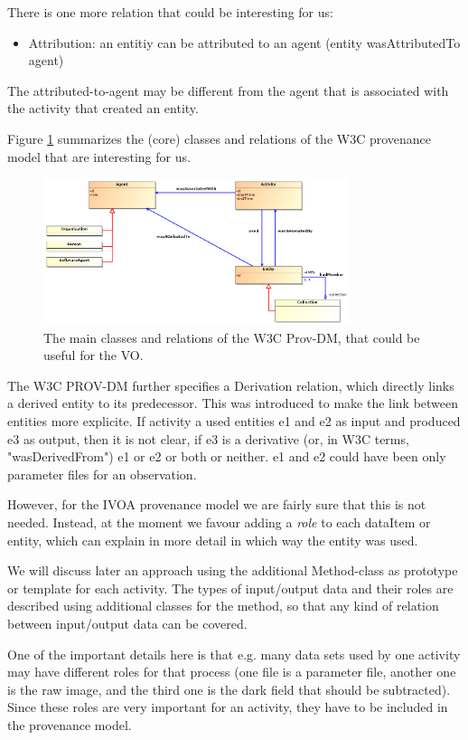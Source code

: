 \documentclass[11pt,a4paper]{ivoa}
\begin{document}
There is one more relation that could be interesting for us:
\begin{itemize}
\item Attribution: an entitiy can be attributed to an agent (entity wasAttributedTo agent)
\end{itemize}
The attributed-to-agent may be different from the agent that is associated with the activity that created an entity.

Figure \ref{fig:w3cclasses} summarizes the (core) classes and relations of the W3C provenance model that are interesting for us.

\begin{figure}
\centering
\includegraphics[width=0.8\textwidth]{ProvDM-W3C-classdiagram.png}
\caption{The main classes and relations of the W3C Prov-DM, that could be useful for the VO.}
\label{fig:w3cclasses}
\end{figure}


The W3C PROV-DM further specifies a Derivation relation, which directly links a derived entity to its predecessor. This was introduced to make the link between entities more explicite. If activity a used entities e1 and e2 as input and produced e3 as output, then it is not clear, if e3 is a derivative (or, in W3C terms, "wasDerivedFrom") e1 or e2 or both or neither. e1 and e2 could have been only parameter files for an observation.  

However, for the IVOA provenance model we are fairly sure that this is not needed. Instead, at the moment we favour adding a \emph{role} to each dataItem or entity, which can explain in more detail in which way the entity was used.

We will discuss later an approach using the additional Method-class as prototype or template for each activity.
The types of input/output data and their roles are described using additional classes for the method, so that any kind of relation between input/output data can be covered.

One of the important details here is that e.g. many data sets used by one activity may have different roles for that process (one file is a parameter file, another one is the raw image, and the third one is the dark field that should be subtracted). Since these roles are very important for an activity, they have to be included in the provenance model.
\end{document}
